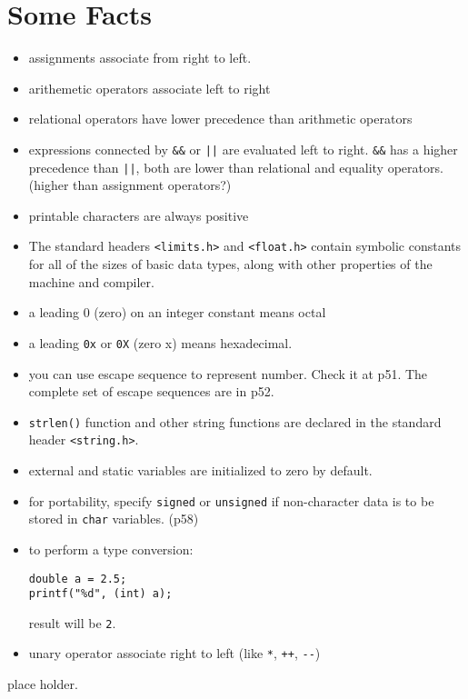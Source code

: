\documentclass[12pt]{article}
\date{\today}
\title{}
\begin{document}
\tableofcontents

\section{Some Facts}
\label{sec:orgf2518f1}
\begin{itemize}
\item assignments associate from right to left.
\item arithemetic operators associate left to right
\item relational operators have lower precedence than arithmetic operators
\item expressions connected by \texttt{\&\&} or \texttt{||} are evaluated left to right. \texttt{\&\&} has a higher precedence than \texttt{||}, both are lower than relational and equality operators. (higher than assignment operators?)
\item printable characters are always positive
\item The standard headers \texttt{<limits.h>} and \texttt{<float.h>} contain symbolic constants for all of the sizes of basic data types, along with other properties of the machine and compiler.
\item a leading 0 (zero) on an integer constant means octal
\item a leading \texttt{0x} or \texttt{0X} (zero x) means hexadecimal.
\item you can use escape sequence to represent number. Check it at p51. The complete set of escape sequences are in p52.
\item \texttt{strlen()} function and other string functions are declared in the standard header \texttt{<string.h>}.
\item external and static variables are initialized to zero by default.
\item for portability, specify \texttt{signed} or \texttt{unsigned} if non-character data is to be stored in \texttt{char} variables. (p58)
\item to perform a type conversion:
\begin{verbatim}
double a = 2.5;
printf("%d", (int) a);  
\end{verbatim}
result will be \texttt{2}.
\item unary operator associate right to left (like \texttt{*}, \texttt{++}, \texttt{-{}-})
\end{itemize}

place holder.
\end{document}
